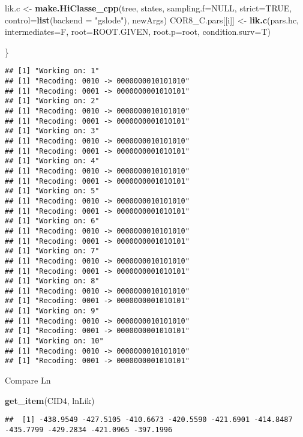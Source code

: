 \documentclass[
]{article}
\newenvironment{Shaded}{\begin{snugshade}}{\end{snugshade}}
\newcommand{\AttributeTok}[1]{\textcolor[rgb]{0.13,0.29,0.53}{#1}}
\newcommand{\ConstantTok}[1]{\textcolor[rgb]{0.56,0.35,0.01}{#1}}
\newcommand{\FunctionTok}[1]{\textcolor[rgb]{0.13,0.29,0.53}{\textbf{#1}}}
\newcommand{\NormalTok}[1]{#1}
\newcommand{\OtherTok}[1]{\textcolor[rgb]{0.56,0.35,0.01}{#1}}
\newcommand{\StringTok}[1]{\textcolor[rgb]{0.31,0.60,0.02}{#1}}
\begin{document}
\begin{Shaded}
\begin{Highlighting}[]
\NormalTok{  lik.c }\OtherTok{\textless{}{-}} \FunctionTok{make.HiClasse\_cpp}\NormalTok{(tree, states,  }\AttributeTok{sampling.f=}\ConstantTok{NULL}\NormalTok{,  }\AttributeTok{strict=}\ConstantTok{TRUE}\NormalTok{, }\AttributeTok{control=}\FunctionTok{list}\NormalTok{(}\AttributeTok{backend =} \StringTok{"gslode"}\NormalTok{), newArgs)}
\NormalTok{  COR8\_C.pars[[i]] }\OtherTok{\textless{}{-}} \FunctionTok{lik.c}\NormalTok{(pars.hc, }\AttributeTok{intermediates=}\NormalTok{F, }\AttributeTok{root=}\NormalTok{ROOT.GIVEN, }\AttributeTok{root.p=}\NormalTok{root, }\AttributeTok{condition.surv=}\NormalTok{T)}
  
\NormalTok{\}}
\end{Highlighting}
\end{Shaded}

\begin{verbatim}
## [1] "Working on: 1"
## [1] "Recoding: 0010 -> 0000000010101010"
## [1] "Recoding: 0001 -> 0000000001010101"
## [1] "Working on: 2"
## [1] "Recoding: 0010 -> 0000000010101010"
## [1] "Recoding: 0001 -> 0000000001010101"
## [1] "Working on: 3"
## [1] "Recoding: 0010 -> 0000000010101010"
## [1] "Recoding: 0001 -> 0000000001010101"
## [1] "Working on: 4"
## [1] "Recoding: 0010 -> 0000000010101010"
## [1] "Recoding: 0001 -> 0000000001010101"
## [1] "Working on: 5"
## [1] "Recoding: 0010 -> 0000000010101010"
## [1] "Recoding: 0001 -> 0000000001010101"
## [1] "Working on: 6"
## [1] "Recoding: 0010 -> 0000000010101010"
## [1] "Recoding: 0001 -> 0000000001010101"
## [1] "Working on: 7"
## [1] "Recoding: 0010 -> 0000000010101010"
## [1] "Recoding: 0001 -> 0000000001010101"
## [1] "Working on: 8"
## [1] "Recoding: 0010 -> 0000000010101010"
## [1] "Recoding: 0001 -> 0000000001010101"
## [1] "Working on: 9"
## [1] "Recoding: 0010 -> 0000000010101010"
## [1] "Recoding: 0001 -> 0000000001010101"
## [1] "Working on: 10"
## [1] "Recoding: 0010 -> 0000000010101010"
## [1] "Recoding: 0001 -> 0000000001010101"
\end{verbatim}

Compare Ln

\begin{Shaded}
\begin{Highlighting}[]
\FunctionTok{get\_item}\NormalTok{(CID4, }\StringTok{\textquotesingle{}lnLik\textquotesingle{}}\NormalTok{)}
\end{Highlighting}
\end{Shaded}

\begin{verbatim}
##  [1] -438.9549 -427.5105 -410.6673 -420.5590 -421.6901 -414.8487 -435.7799 -429.2834 -421.0965 -397.1996
\end{verbatim}
\end{document}
